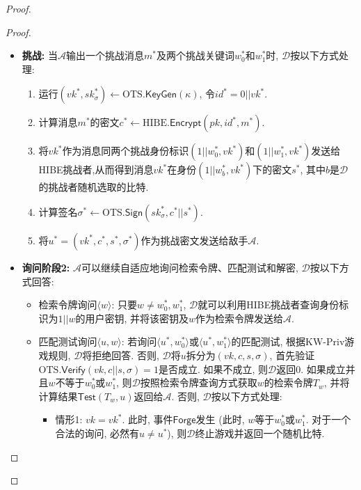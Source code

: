 \begin{proof}
\begin{proof}
\begin{trivlist}
\begin{itemize}
	\item \textbf{挑战:} 当$\mathcal{A}$输出一个挑战消息$m^*$及两个挑战关键词$w_0^*$和$w_1^*$时, $\mathcal{D}$按以下方式处理:\vspace{-0.5em}
		\begin{enumerate} \itemsep 1pt \parskip 0pt \parsep 0pt
			\item 运行$(vk^*, sk_\sigma^*) \leftarrow \text{OTS}.\mathsf{KeyGen}(\kappa)$, 令$id^* = 0||vk^*$.
			\item 计算消息$m^*$的密文$c^* \leftarrow \text{HIBE}.\mathsf{Encrypt}(pk, id^*, m^*)$.
			\item 将$vk^*$作为消息同两个挑战身份标识$(1||w_0^*, vk^*)$和$(1||w_1^*, vk^*)$发送给HIBE挑战者,从而得到消息$vk^*$在身份$(1||w_b^*, vk^*)$下的密文$s^*$, 其中$b$是$\mathcal{D}$的挑战者随机选取的比特.
			\item 计算签名$\sigma^* \leftarrow \text{OTS}.\mathsf{Sign}(sk_\sigma^*, c^*||s^*)$.
			\item 将$u^* = (vk^*, c^*, s^*, \sigma^*)$作为挑战密文发送给敌手$\mathcal{A}$.
		\end{enumerate}

	\item \textbf{询问阶段2:} $\mathcal{A}$可以继续自适应地询问检索令牌、匹配测试和解密, $\mathcal{D}$按以下方式回答:\vspace{-0.5em}
		\begin{itemize} \itemsep 1pt \parskip 0pt \parsep 0pt
			\item 检索令牌询问$\langle w \rangle$: 只要$w \neq w_0^*, w_1^*$, $\mathcal{D}$就可以利用HIBE挑战者查询身份标识为$1||w$的用户密钥, 并将该密钥及$w$作为检索令牌发送给$\mathcal{A}$.

			\item 匹配测试询问$\langle u, w \rangle$: 若询问$\langle u^*, w_0^*\rangle$或$\langle u^*, w_1^*\rangle$的匹配测试, 根据KW-Priv游戏规则, $\mathcal{D}$将拒绝回答. 否则, $\mathcal{D}$将$u$拆分为$(vk, c, s, \sigma)$, 首先验证$\text{OTS}.\mathsf{Verify}(vk, c||s, \sigma) = 1$是否成立. 如果不成立, 则$\mathcal{D}$返回$0$.
				如果成立并且$w$不等于$w_0^*$或$w_1^*$, 则$\mathcal{D}$按照检索令牌查询方式获取$w$的检索令牌$T_w$, 并将计算结果$\mathsf{Test}(T_w, u)$返回给$\mathcal{A}$. 否则, $\mathcal{D}$按以下方式处理:\vspace{-0.5em}
				\begin{itemize} \itemsep 1pt \parskip 0pt \parsep 0pt
					\item 情形1: $vk = vk^*$. 此时, 事件$\mathsf{Forge}$发生 (此时, $w$等于$w_0^*$或$w_1^*$. 对于一个合法的询问, 必然有$u \neq u^*$), 则$\mathcal{D}$终止游戏并返回一个随机比特.


\end{itemize}
\end{itemize}
\end{itemize}
\end{trivlist}
\end{proof}
\end{proof}
